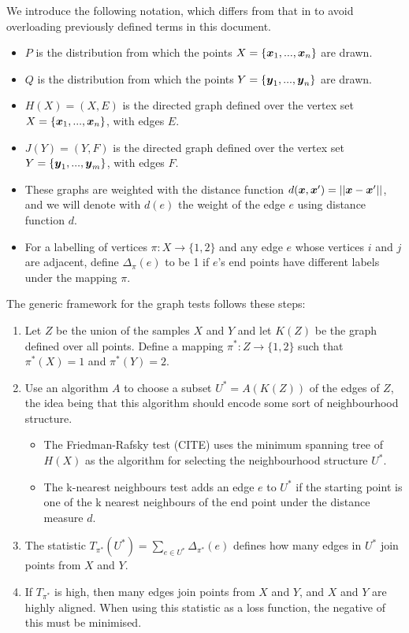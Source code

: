 
We introduce the following notation, which differs from that in \cite{torchtwosample} to avoid overloading previously defined terms in this document. 

\begin{itemize}
    \item $P$ is the distribution from which the points $X = \{\boldsymbol{x}_1, ..., \boldsymbol{x}_n \}$ are drawn.
    \item $Q$ is the distribution from which the points $Y = \{\boldsymbol{y}_1, ..., \boldsymbol{y}_n \}$ are drawn.
    \item $H(X) = (X, E)$ is the directed graph defined over the vertex set $X = \{\boldsymbol{x}_1, ..., \boldsymbol{x}_n \}$, with edges $E$.
    \item $J(Y) = (Y, F) $ is the directed graph defined over the vertex set $Y = \{\boldsymbol{y}_1, ..., \boldsymbol{y}_m \}$, with edges $F$. 
    \item These graphs are weighted with the distance function $d(\boldsymbol{x}, \boldsymbol{x}') = || \boldsymbol{x} - \boldsymbol{x}'||$, and we will denote with $d(e)$ the weight of the edge $e$ using distance function $d$. 
    \item For a labelling of vertices $\pi: X \rightarrow \{1, 2\}$ and any edge $e$ whose vertices $i$ and $j$ are adjacent, define $\Delta_{\pi}(e)$ to be 1 if $e$'s end points have different labels under the mapping $\pi$. 
\end{itemize}

The generic framework for the graph tests follows these steps:

\begin{enumerate}
    \item Let $Z$ be the union of the samples $X$ and $Y$ and let $K(Z)$ be the graph defined over all points. Define a mapping $\pi^* : Z \rightarrow \{1, 2\}$ such that $\pi^*(X) = 1$ and $\pi^*(Y) = 2$.
    \item Use an algorithm $A$ to choose a subset $U^* = A(K(Z))$ of the edges of $Z$, the idea being that this algorithm should encode some sort of neighbourhood structure.
    \begin{itemize}
        \item The Friedman-Rafsky test (CITE) uses the minimum spanning tree of $H(X)$ as the algorithm for selecting the neighbourhood structure $U^*$. 

        \item The k-nearest neighbours test adds an edge $e$ to $U^*$ if the starting point is one of the k nearest neighbours of the end point under the distance measure $d$.
    \end{itemize}
    \item The statistic $T_{\pi^*}(U^*) = \sum_{e \in U^*} \Delta_{\pi^*} (e)$ defines how many edges in $U^*$ join points from $X$ and $Y$. 
    \item If $T_{\pi^*}$ is high, then many edges join points from $X$ and $Y$, and $X$ and $Y$ are highly aligned. When using this statistic as a loss function, the negative of this must be minimised.
\end{enumerate}

